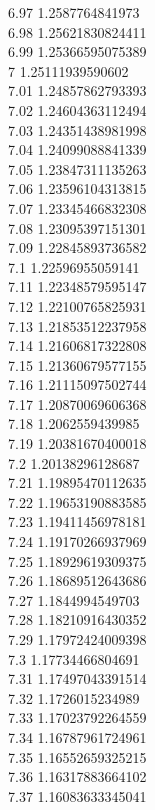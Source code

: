 {6.97	1.2587764841973\\
6.98	1.25621830824411\\
6.99	1.25366595075389\\
7	1.25111939590602\\
7.01	1.24857862793393\\
7.02	1.24604363112494\\
7.03	1.24351438981998\\
7.04	1.24099088841339\\
7.05	1.23847311135263\\
7.06	1.23596104313815\\
7.07	1.23345466832308\\
7.08	1.23095397151301\\
7.09	1.22845893736582\\
7.1	1.22596955059141\\
7.11	1.22348579595147\\
7.12	1.22100765825931\\
7.13	1.21853512237958\\
7.14	1.21606817322808\\
7.15	1.21360679577155\\
7.16	1.21115097502744\\
7.17	1.20870069606368\\
7.18	1.2062559439985\\
7.19	1.20381670400018\\
7.2	1.20138296128687\\
7.21	1.19895470112635\\
7.22	1.19653190883585\\
7.23	1.19411456978181\\
7.24	1.19170266937969\\
7.25	1.18929619309375\\
7.26	1.18689512643686\\
7.27	1.1844994549703\\
7.28	1.18210916430352\\
7.29	1.17972424009398\\
7.3	1.17734466804691\\
7.31	1.17497043391514\\
7.32	1.1726015234989\\
7.33	1.17023792264559\\
7.34	1.16787961724961\\
7.35	1.16552659325215\\
7.36	1.16317883664102\\
7.37	1.16083633345041\\
}
